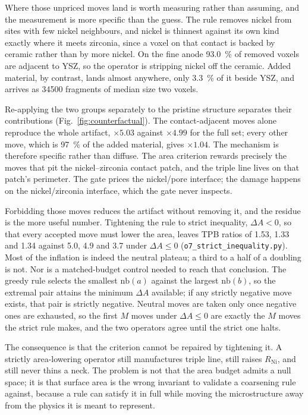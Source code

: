 \documentclass[5p,times,twocolumn]{elsarticle}
\newcommand{\Rni}{R_{\mathrm{Ni}}}
\newcommand{\nb}{\mathrm{nb}}
\begin{document}
Where those unpriced moves land is worth measuring rather than assuming, and
the measurement is more specific than the guess. The rule removes nickel from
sites with few nickel neighbours, and nickel is thinnest against its own kind
exactly where it meets zirconia, since a voxel on that contact is backed by
ceramic rather than by more nickel. On the fine anode \SI{93.0}{\percent} of removed voxels are adjacent to YSZ, so
the operator is stripping nickel off the ceramic. Added material, by contrast, lands almost anywhere,
only \SI{3.3}{\percent} of it beside YSZ, and arrives as
\num{34500} fragments of median size two voxels.

Re-applying the two groups separately to the pristine structure separates their
contributions (Fig.~\ref{fig:counterfactual}). The contact-adjacent moves alone
reproduce the whole artifact, $\times 5.03$ against $\times 4.99$ for the full
set; every other move, which is \SI{97}{\percent} of the added material, gives
$\times 1.04$. The mechanism is therefore specific rather than diffuse. The area criterion
rewards precisely the moves that pit the nickel--zirconia contact patch, and the triple line lives on that patch's perimeter. The gate
prices the nickel/pore interface; the damage happens on the nickel/zirconia
interface, which the gate never inspects.

Forbidding those moves reduces the artifact without removing it, and the
residue is the more useful number. Tightening the rule to strict inequality,
$\Delta A < 0$, so that every accepted move must lower the area, leaves TPB
ratios of 1.53, 1.33 and 1.34 against 5.0, 4.9 and 3.7 under $\Delta A \leq 0$
(\texttt{o7\_strict\_inequality.py}). Most of the inflation is indeed the
neutral plateau; a third to a half of a doubling is not. Nor is a matched-budget
control needed to reach that conclusion. The greedy rule selects the smallest
$\nb(a)$ against the largest $\nb(b)$, so the extremal pair attains the minimum
$\Delta A$ available; if any strictly negative move exists, that pair is
strictly negative. Neutral moves are taken only once negative ones are
exhausted, so the first $M$ moves under $\Delta A \leq 0$ are exactly the $M$
moves the strict rule makes, and the two operators agree until the strict one
halts.

The consequence is that the criterion cannot be repaired by tightening it. A
strictly area-lowering operator still manufactures triple line, still raises
$\Rni$, and still never thins a neck. The problem is not that the area budget
admits a null space; it is that surface area is the wrong invariant to validate
a coarsening rule against, because a rule can satisfy it in full while moving
the microstructure away from the physics it is meant to represent.
\end{document}
